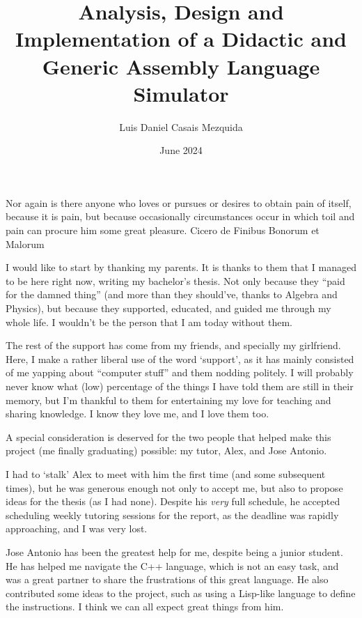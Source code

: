 \documentclass[en]{uc3mthesisIEEE}
\title{Analysis, Design and Implementation of a Didactic and Generic Assembly Language Simulator}
\author{Luis Daniel Casais Mezquida}
\date{June 2024}
\begin{document}
  \makecover


  \makeepigraph
    {
      Nor again is there anyone who loves or pursues or desires to obtain pain of itself, because it is pain, but because occasionally circumstances occur in which toil and pain can procure him some great pleasure.
    }  %
    {Cicero}  %
    {de Finibus Bonorum et Malorum}  %


  \begin{acknowledgements}
    I would like to start by thanking my parents. It is thanks to them that I managed to be here right now, writing my bachelor's thesis. Not only because they ``paid for the damned thing'' (and more than they should've, thanks to Algebra and Physics), but because they supported, educated, and guided me through my whole life. I wouldn't be the person that I am today without them.

    The rest of the support has come from my friends, and specially my girlfriend. Here, I make a rather liberal use of the word `support', as it has mainly consisted of me yapping about ``computer stuff'' and them nodding politely. I will probably never know what (low) percentage of the things I have told them are still in their memory, but I'm thankful to them for entertaining my love for teaching and sharing knowledge. I know they love me, and I love them too.

    A special consideration is deserved for the two people that helped make this project (me finally graduating) possible: my tutor, Alex, and Jose Antonio.

    I had to `stalk' Alex to meet with him the first time (and some subsequent times), but he was generous enough not only to accept me, but also to propose ideas for the thesis (as I had none). Despite his \textit{very} full schedule, he accepted scheduling weekly tutoring sessions for the report, as the deadline was rapidly approaching, and I was very lost.

    Jose Antonio has been the greatest help for me, despite being a junior student. He has helped me navigate the C++ language, which is not an easy task, and was a great partner to share the frustrations of this great language. He also contributed some ideas to the project, such as using a Lisp-like language to define the instructions. I think we can all expect great things from him.


\end{acknowledgements}
\end{document}
